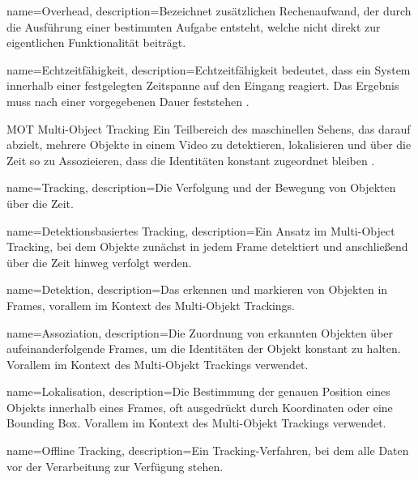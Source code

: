 {
        name=Overhead,
        description={Bezeichnet zusätzlichen Rechenaufwand, der durch die Ausführung einer bestimmten Aufgabe entsteht, welche nicht direkt zur eigentlichen Funktionalität beiträgt.}
}


{
        name=Echtzeitfähigkeit,
        description={Echtzeitfähigkeit bedeutet, dass ein System innerhalb einer festgelegten Zeitspanne auf den Eingang reagiert. Das Ergebnis muss nach einer vorgegebenen Dauer feststehen \cite{Scholz.2005}.}
}


\newglossaryentrywithacronym
{MOT}
{Multi-Object Tracking}
{Ein Teilbereich des maschinellen Sehens, das darauf abzielt, mehrere Objekte in einem Video zu detektieren, lokalisieren und über die Zeit so zu Assozieieren, dass die Identitäten konstant zugeordnet bleiben \cite{HOTA}.}

{
name=Tracking,
description={Die Verfolgung und der Bewegung von Objekten über die Zeit.}
}

{
name=Detektionsbasiertes Tracking,
description={Ein Ansatz im Multi-Object Tracking, bei dem Objekte zunächst in jedem Frame detektiert und anschließend über die Zeit hinweg verfolgt werden.}
}

{
name=Detektion,
description={Das erkennen und markieren von Objekten in Frames, vorallem im Kontext des Multi-Objekt Trackings.}
}

{
name=Assoziation,
description={Die Zuordnung von erkannten Objekten über aufeinanderfolgende Frames, um die  Identitäten der Objekt konstant zu halten. Vorallem im Kontext des Multi-Objekt Trackings verwendet.}
}

{
name=Lokalisation,
description={Die Bestimmung der genauen Position eines Objekts innerhalb eines Frames, oft ausgedrückt durch Koordinaten oder eine Bounding Box. Vorallem im Kontext des Multi-Objekt Trackings verwendet.}
}

{
name=Offline Tracking,
description={Ein Tracking-Verfahren, bei dem alle Daten vor der Verarbeitung zur Verfügung stehen.}
}

